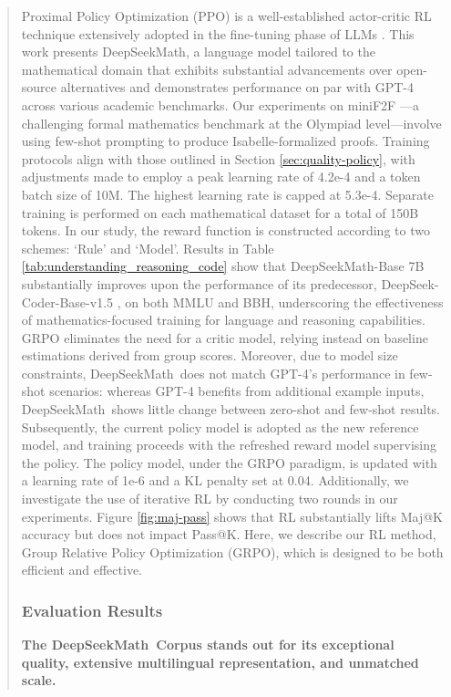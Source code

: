 \begin{abstract}
\begin{itemize}[topsep=0pt]
\begin{itemize}[topsep=0pt]
Proximal Policy Optimization (PPO) \citep{schulman2017proximal} is a well-established actor-critic RL technique extensively adopted in the fine-tuning phase of LLMs \citep{ouyang2022training}. This work presents DeepSeekMath, a language model tailored to the mathematical domain that exhibits substantial advancements over open-source alternatives and demonstrates performance on par with GPT-4 across various academic benchmarks. Our experiments on miniF2F \citep{minif2f}—a challenging formal mathematics benchmark at the Olympiad level—involve using few-shot prompting to produce Isabelle-formalized proofs. Training protocols align with those outlined in Section \ref{sec:quality-policy}, with adjustments made to employ a peak learning rate of 4.2e-4 and a token batch size of 10M. The highest learning rate is capped at 5.3e-4. Separate training is performed on each mathematical dataset for a total of 150B tokens. In our study, the reward function is constructed according to two schemes: `Rule’ and `Model’. Results in Table \ref{tab:understanding_reasoning_code} show that DeepSeekMath-Base 7B substantially improves upon the performance of its predecessor, DeepSeek-Coder-Base-v1.5 \citep{deepseek-coder}, on both MMLU and BBH, underscoring the effectiveness of mathematics-focused training for language and reasoning capabilities. GRPO eliminates the need for a critic model, relying instead on baseline estimations derived from group scores. Moreover, due to model size constraints, DeepSeekMath~does not match GPT-4’s performance in few-shot scenarios: whereas GPT-4 benefits from additional example inputs, DeepSeekMath~shows little change between zero-shot and few-shot results. Subsequently, the current policy model is adopted as the new reference model, and training proceeds with the refreshed reward model supervising the policy. The policy model, under the GRPO paradigm, is updated with a learning rate of 1e-6 and a KL penalty set at 0.04. Additionally, we investigate the use of iterative RL by conducting two rounds in our experiments. Figure \ref{fig:maj-pass} shows that RL substantially lifts Maj@K accuracy but does not impact Pass@K. Here, we describe our RL method, Group Relative Policy Optimization (GRPO), which is designed to be both efficient and effective. \subsubsection{Evaluation Results}

\textbf{The DeepSeekMath~Corpus stands out for its exceptional quality, extensive multilingual representation, and unmatched scale.}


\end{itemize}
\end{itemize}
\end{abstract}
